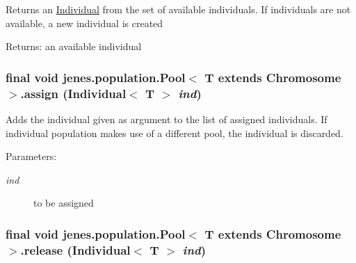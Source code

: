 Returns an \hyperlink{}{Individual} from the set of available individuals. If individuals are not available, a new individual is created

\begin{Desc}
\item[Returns:]an available individual \end{Desc}
\hypertarget{classjenes_1_1population_1_1_pool_3_01_t_01extends_01_chromosome_01_4_ea055f4f71829a56c9d16780d010e861}{
\subsubsection[assign]{\setlength{\rightskip}{0pt plus 5cm}final void jenes.population.Pool$<$ T extends Chromosome $>$.assign (Individual$<$ T $>$ {\em ind})}}
\label{classjenes_1_1population_1_1_pool_3_01_t_01extends_01_chromosome_01_4_ea055f4f71829a56c9d16780d010e861}


Adds the individual given as argument to the list of assigned individuals. If individual population makes use of a different pool, the individual is discarded. 

\begin{Desc}
\item[Parameters:]
\begin{description}
\item[{\em ind}]to be assigned \end{description}
\end{Desc}
\hypertarget{classjenes_1_1population_1_1_pool_3_01_t_01extends_01_chromosome_01_4_5fce371a24676e555aca961e61fb55ae}{
\subsubsection[release]{\setlength{\rightskip}{0pt plus 5cm}final void jenes.population.Pool$<$ T extends Chromosome $>$.release (Individual$<$ T $>$ {\em ind})}}
\label{classjenes_1_1population_1_1_pool_3_01_t_01extends_01_chromosome_01_4_5fce371a24676e555aca961e61fb55ae}


